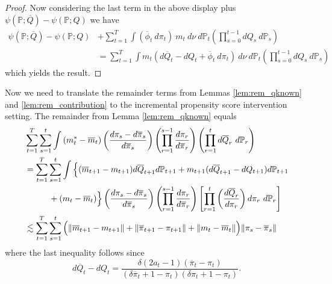 \documentclass[12pt]{article}
\newcommand{\Pb}{\mathbb{P}}
\newcommand{\E}{\mathbb{E}}
\theoremstyle{remark}
\begin{document}
\begin{proof}
Now considering the last term in the above display plus $\psi(\Pb;\overline{Q}) - \psi(\Pb;Q)$ we have
\begin{align*}
\psi(\Pb;\overline{Q}) - \psi(\Pb;Q) &+ \sum_{t=1}^T \int (\overline\phi_t \ d\pi_t) \ m_t \ d\nu \ d\Pb_t \left( \prod_{s=0}^{t-1} dQ_s  \ d\Pb_s \right) \\
&= \sum_{t=1}^T \int  m_t (d\overline{Q}_t - dQ_t + \overline\phi_t \ d\pi_t) \ d\nu \ d\Pb_t \left( \prod_{s=0}^{t-1} dQ_s  \ d\Pb_s \right)
\end{align*}
which yields the result.
\end{proof}

Now we need to translate the remainder terms from Lemmas \ref{lem:rem_qknown} and \ref{lem:rem_contribution} to the incremental propensity score intervention setting. The remainder from Lemma \ref{lem:rem_qknown} equals
\begin{align*}
&\sum_{t=1}^T \sum_{s =1}^t \int \left( m_t^* - \overline{m}_t \right)\left( \frac{d\pi_s-d\overline\pi_s}{d\overline\pi_s} \right) \left( \prod_{r=1}^{s-1}   \frac{d\pi_r}{d\overline\pi_r} \right)  \left( \prod_{r=1}^t d\overline{Q}_r \ d\Pb_r \right) \\
&= \sum_{t=1}^T \sum_{s =1}^t \int \Big\{ (\overline{m}_{t+1} - {m}_{t+1}) d\overline{Q}_{t+1} d\Pb_{t+1} + m_{t+1}( d\overline{Q}_{t+1} - dQ_{t+1}) d\Pb_{t+1}  \\
&\hspace{.4in} +  (m_t - \overline{m}_t) \Big\}  \left( \frac{d\pi_s - d\overline\pi_s}{d\overline\pi_s} \right)  \left( \prod_{r=1}^{s-1}   \frac{d\pi_r}{d\overline\pi_r} \right)  \left[ \prod_{r=1}^t \left( \frac{d\overline{Q}_r}{d\pi_r} \right) d\pi_r \ d\Pb_r \right] \\
&\lesssim \sum_{t=1}^T \sum_{s =1}^t  \Big( \| \overline{m}_{t+1} - m_{t+1} \| + \|\overline\pi_{t+1} - \pi_{t+1} \| + \| m_t - \overline{m}_t \| \Big) \| \pi_s - \overline\pi_s \|
\end{align*}
where the last inequality follows since
$$ d\overline{Q}_t - dQ_t =  \frac{\delta(2 a_t - 1)(\overline\pi_t-\pi_t)}{ (\delta \overline\pi_t + 1-\pi_t)(\delta \pi_t + 1-\pi_t)} . $$
\end{document}

